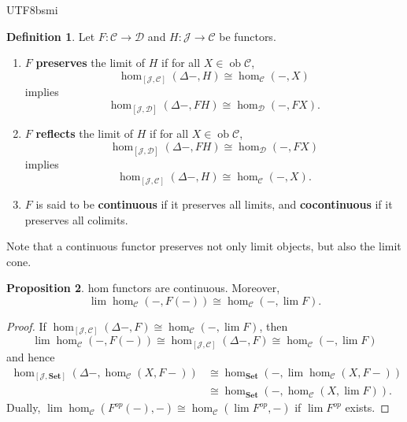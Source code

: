 \documentclass[12pt]{article}
\theoremstyle{definition}
\newtheorem{definition}{Definition}[section]
\newtheorem{property}[definition]{Proposition}
\newcommand\<{\langle}
\renewcommand\>{\rangle}
\DeclareMathOperator{\ob}{ob}
\begin{document}
\begin{CJK}{UTF8}{bsmi}
\begin{definition}
    Let $F:\mathcal{C}\to\mathcal{D}$ and $H:\mathcal{J}\to\mathcal{C}$ be functors.
    \begin{enumerate}
        \item $F$ \textbf{preserves} the limit of $H$ if for all $X\in\ob\mathcal{C}$,
        \[
            \hom_{[\mathcal{J}, \mathcal{C}]}(\Delta-, H)\cong\hom_\mathcal{C}(-, X)
        \]
        implies
        \[
            \hom_{[\mathcal{J}, \mathcal{D}]}(\Delta-, FH) \cong \hom_\mathcal{D}(-, FX).
        \]
        \item $F$ \textbf{reflects} the limit of $H$ if for all $X\in\ob\mathcal{C}$,
        \[
            \hom_{[\mathcal{J}, \mathcal{D}]}(\Delta-, FH) \cong \hom_\mathcal{D}(-, FX)
        \]
        implies
        \[
            \hom_{[\mathcal{J}, \mathcal{C}]}(\Delta-, H)\cong\hom_\mathcal{C}(-, X).
        \]
        \item $F$ is said to be \textbf{continuous} if it preserves all limits, and \textbf{cocontinuous} if it preserves all colimits.
    \end{enumerate}
\end{definition}

Note that a continuous functor preserves not only limit objects, but also the limit cone.

\begin{property}
\label{hom are conti.}
    hom functors are continuous.
    Moreover,
    \[
        \lim\hom_\mathcal{C}(-, F(-)) \cong \hom_\mathcal{C}(-, \lim F).
    \]
\end{property}
\begin{proof}
    If $\hom_{[\mathcal{J}, \mathcal{C}]}(\Delta-, F)\cong\hom_\mathcal{C}(-, \lim F)$, then
    \[
        \lim\hom_\mathcal{C}(-, F(-)) \cong \hom_{[\mathcal{J}, \mathcal{C}]}(\Delta-, F) \cong \hom_\mathcal{C}(-, \lim F)
    \]
    and hence
    \begin{align*}
        \hom_{[\mathcal{J}, \textbf{Set}]}(\Delta-, \hom_\mathcal{C}(X, F-)) 
        & \cong  \hom_{\textbf{Set}}(-, \lim\hom_\mathcal{C}(X, F-)) \\ 
        & \cong  \hom_{\textbf{Set}}(-, \hom_\mathcal{C}(X, \lim F)).
    \end{align*}
    Dually, $\lim\hom_\mathcal{C}(F^{op}(-), -) \cong \hom_\mathcal{C}(\lim F^{op}, -)$ if $\lim F^{op}$ exists.
\end{proof}


\end{CJK}
\end{document}

